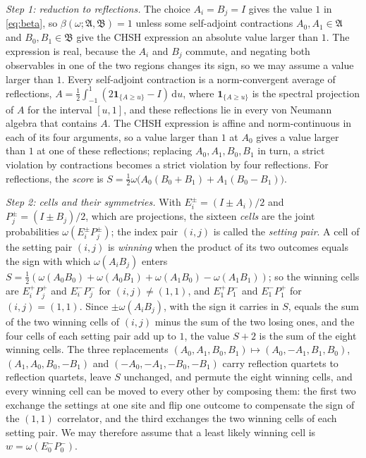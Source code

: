 \documentclass[aps,prl,reprint,longbibliography,raggedbottom]{revtex4-2}
\newcommand{\dd}{\,\mathrm d}
\newcommand{\A}{\mathfrak A}
\newcommand{\B}{\mathfrak B}
\begin{document}
\emph{Step 1: reduction to reflections.} The choice
$A_i=B_j=I$ gives the value $1$
in \eqref{eq:beta}, so $\beta(\omega;\A,\B)=1$ unless some self-adjoint
contractions $A_0,A_1\in\A$ and $B_0,B_1\in\B$ give the CHSH expression
an absolute value larger than $1$. The expression is real, because the
$A_i$ and $B_j$ commute, and negating both observables in one of the
two regions
changes its sign, so we may assume a value larger than $1$. Every
self-adjoint contraction is a norm-convergent average of reflections,
$A=\frac12\int_{-1}^1(2\mathbf 1_{\{A\ge u\}}-I)\dd u$, where
$\mathbf 1_{\{A\ge u\}}$ is the spectral projection of $A$ for the
interval $[u,1]$, and these reflections lie in every von Neumann algebra that
contains $A$. The CHSH expression is
affine and norm-continuous in each of its four arguments, so a value
larger than $1$ at $A_0$ gives a value larger than $1$ at one of these
reflections; replacing $A_0,A_1,B_0,B_1$ in turn, a strict violation by
contractions becomes a strict violation by four reflections. For
reflections, the \emph{score} is
$S=\frac12\omega\bigl(A_0(B_0+B_1)+A_1(B_0-B_1)\bigr)$.

\emph{Step 2: cells and their symmetries.} With
$E_i^\pm=(I\pm A_i)/2$ and $P_j^\pm=(I\pm B_j)/2$, which are
projections, the sixteen \emph{cells} are the joint probabilities
$\omega(E_i^\pm P_j^\pm)$; the index pair $(i,j)$ is called the
\emph{setting pair}. A cell of the setting pair $(i,j)$ is
\emph{winning} when the product of its two outcomes equals the sign
with which $\omega(A_iB_j)$ enters
$S=\frac12(\omega(A_0B_0)+\omega(A_0B_1)+\omega(A_1B_0)-\omega(A_1B_1))$;
so the winning cells are $E_i^+P_j^+$ and $E_i^-P_j^-$ for
$(i,j)\ne(1,1)$, and $E_1^+P_1^-$ and $E_1^-P_1^+$ for $(i,j)=(1,1)$.
Since $\pm\omega(A_iB_j)$, with the sign it carries in $S$, equals the
sum of the two winning cells of $(i,j)$ minus the sum of the two losing
ones, and the four cells of each setting pair add up to $1$, the value
$S+2$ is the sum of the eight winning cells.
The three replacements
$(A_0,A_1,B_0,B_1)\mapsto(A_0,-A_1,B_1,B_0)$,
$(A_1,A_0,B_0,-B_1)$ and $(-A_0,-A_1,-B_0,-B_1)$ carry reflection
quartets to reflection quartets, leave $S$ unchanged, and permute the
eight winning cells, and every winning cell can be moved to every
other by composing them: the first two exchange the settings
at one site and flip one outcome to compensate the sign of the
$(1,1)$ correlator, and the third exchanges the two winning cells of
each setting pair. We may therefore assume that a least likely winning
cell is $w=\omega(E_0^-P_0^-)$.
\end{document}

